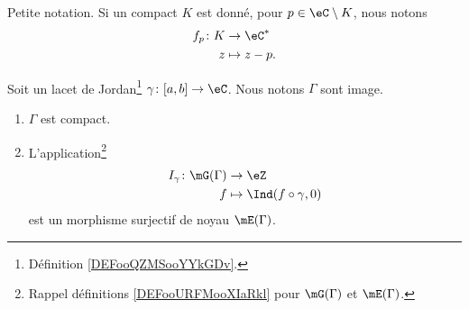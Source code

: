 Petite notation. Si un compact \( K\) est donné, pour \( p\in\eC\setminus K\), nous notons
\begin{equation}
	\begin{aligned}
		f_p\colon K & \to \eC^*    \\
		z           & \mapsto z-p.
	\end{aligned}
\end{equation}

\begin{lemma}     \label{LEMooBZUCooHWfolf}
	Soit un lacet de Jordan\footnote{Définition \ref{DEFooQZMSooYYkGDv}.} \( \gamma\colon \mathopen[ a , b \mathclose]\to \eC\). Nous notons \( \Gamma\) sont image.
	\begin{enumerate}
		\item
		      \( \Gamma\) est compact.
		\item
		      L'application\footnote{Rappel définitions \ref{DEFooURFMooXIaRkl} pour \( \mG(\Gamma)\) et \( \mE(\Gamma)\).}
		      \begin{equation}
			      \begin{aligned}
				      I_{\gamma}\colon \mG(\Gamma) & \to \eZ                        \\
				      f                            & \mapsto \Ind(f\circ \gamma, 0)
			      \end{aligned}
		      \end{equation}
		      est un morphisme surjectif de noyau \( \mE(\Gamma)\).
	\end{enumerate}
\end{lemma}

